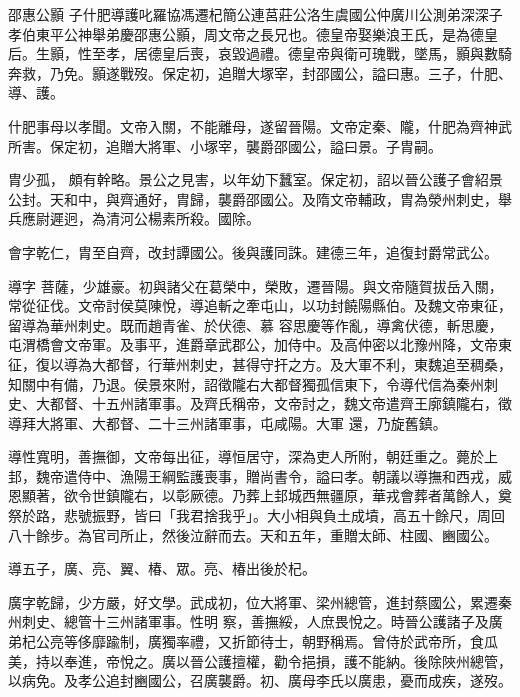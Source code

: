 
\begin{pinyinscope}

 邵惠公顥
 子什肥導護叱羅協馮遷杞簡公連莒莊公洛生虞國公仲廣川公測弟深深子孝伯東平公神舉弟慶邵惠公顥，周文帝之長兄也。德皇帝娶樂浪王氏，是為德皇后。生顥，性至孝，居德皇后喪，哀毀過禮。德皇帝與衛可瑰戰，墜馬，顥與數騎奔救，乃免。顥遂戰歿。保定初，追贈大塚宰，封邵國公，謚曰惠。三子，什肥、導、護。



 什肥事母以孝聞。文帝入關，不能離母，遂留晉陽。文帝定秦、隴，什肥為齊神武所害。保定初，追贈大將軍、小塚宰，襲爵邵國公，謚曰景。子胄嗣。



 胄少孤，
 頗有幹略。景公之見害，以年幼下蠶室。保定初，詔以晉公護子會紹景公封。天和中，與齊通好，胄歸，襲爵邵國公。及隋文帝輔政，胄為滎州刺史，舉兵應尉遲迥，為清河公楊素所殺。國除。



 會字乾仁，胄至自齊，改封譚國公。後與護同誅。建德三年，追復封爵常武公。



 導字
 菩薩，少雄豪。初與諸父在葛榮中，榮敗，遷晉陽。與文帝隨賀拔岳入關，常從征伐。文帝討侯莫陳悅，導追斬之牽屯山，以功封饒陽縣伯。及魏文帝東征，留導為華州刺史。既而趙青雀、於伏德、慕
 容思慶等作亂，導禽伏德，斬思慶，屯渭橋會文帝軍。及事平，進爵章武郡公，加侍中。及高仲密以北豫州降，文帝東征，復以導為大都督，行華州刺史，甚得守扞之方。及大軍不利，東魏追至稠桑，知關中有備，乃退。侯景來附，詔徵隴右大都督獨孤信東下，令導代信為秦州刺史、大都督、十五州諸軍事。及齊氏稱帝，文帝討之，魏文帝遣齊王廓鎮隴右，徵導拜大將軍、大都督、二十三州諸軍事，屯咸陽。大軍
 還，乃旋舊鎮。



 導性寬明，善撫御，文帝每出征，導恒居守，深為吏人所附，朝廷重之。薨於上邽，魏帝遣侍中、漁陽王綱監護喪事，贈尚書令，謚曰孝。朝議以導撫和西戎，威恩顯著，欲令世鎮隴右，以彰厥德。乃葬上邽城西無疆原，華戎會葬者萬餘人，奠祭於路，悲號振野，皆曰「我君捨我乎」。大小相與負土成墳，高五十餘尺，周回八十餘步。為官司所止，然後泣辭而去。天和五年，重贈太師、柱國、豳國公。



 導五子，廣、亮、翼、椿、眾。亮、椿出後於杞。



 廣字乾歸，少方嚴，好文學。武成初，位大將軍、梁州總管，進封蔡國公，累遷秦州刺史、總管十三州諸軍事。性明
 察，善撫綏，人庶畏悅之。時晉公護諸子及廣弟杞公亮等侈靡踰制，廣獨率禮，又折節待士，朝野稱焉。曾侍於武帝所，食瓜美，持以奉進，帝悅之。廣以晉公護擅權，勸令挹損，護不能納。後除陜州總管，以病免。及孝公追封豳國公，召廣襲爵。初、廣母李氏以廣患，憂而成疾，遂歿。




\end{pinyinscope}
